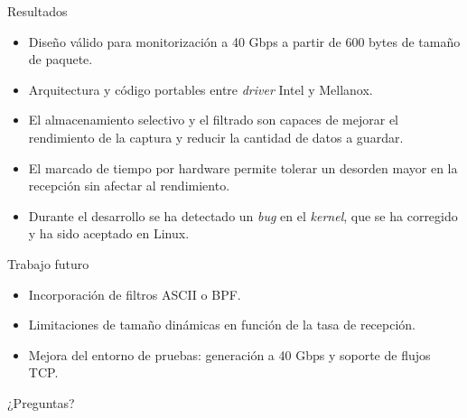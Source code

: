 \documentclass[10pt,notes,compress,usetitleprogressbar,aspectratio=1610]{beamer}
\begin{document}
\begin{frame}{Resultados}
\begin{itemize}
\item Diseño válido para monitorización a 40 Gbps a partir de 600 bytes de tamaño de paquete.
\item Arquitectura y código portables entre \textit{driver} Intel y Mellanox.
\item El almacenamiento selectivo y el filtrado son capaces de mejorar el rendimiento de la captura y reducir la cantidad de datos a guardar.
\item El marcado de tiempo por hardware permite tolerar un desorden mayor en la recepción sin afectar al rendimiento.
\item Durante el desarrollo se ha detectado un \textit{bug} en el \textit{kernel}, que se ha corregido y ha sido aceptado en Linux.
\end{itemize}

\end{frame}

\begin{frame}{Trabajo futuro}
\begin{itemize}
\item Incorporación de filtros ASCII o BPF.
\item Limitaciones de tamaño dinámicas en función de la tasa de recepción.
\item Mejora del entorno de pruebas: generación a 40 Gbps y soporte de flujos TCP.
\end{itemize}

\end{frame}

\begin{frame}[standout]
¿Preguntas?

\end{frame}
\end{document}
